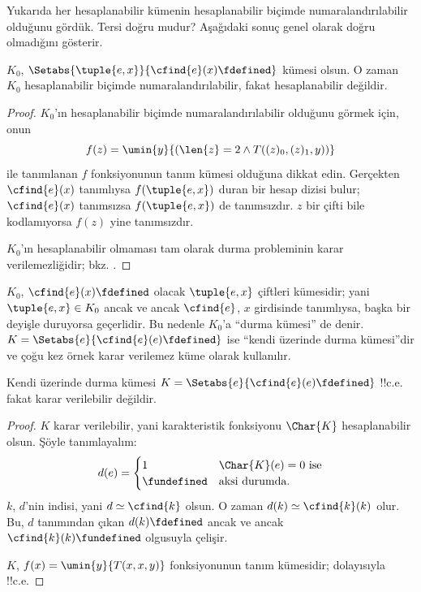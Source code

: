 \documentclass[../../../include/open-logic-section]{subfiles}
\begin{document}

Yukarıda her hesaplanabilir kümenin hesaplanabilir biçimde
numaralandırılabilir olduğunu gördük. Tersi doğru mudur? Aşağıdaki sonuç
genel olarak doğru olmadığını gösterir.

\begin{thm}
$K_0$, $\Setabs{\tuple{e,x}}{\cfind{e}(x)\fdefined}$ kümesi olsun.
O zaman $K_0$ hesaplanabilir biçimde numaralandırılabilir, fakat
hesaplanabilir değildir.
\end{thm}

\begin{proof}
$K_0$'ın hesaplanabilir biçimde numaralandırılabilir olduğunu görmek için,
onun
\[
  f(z)=\umin{y}{(\len{z}=2\land T((z)_0,(z)_1,y))}
\]
ile tanımlanan $f$ fonksiyonunun tanım kümesi olduğuna dikkat edin.
Gerçekten $\cfind{e}(x)$ tanımlıysa $f(\tuple{e,x})$ duran bir hesap dizisi
bulur; $\cfind{e}(x)$ tanımsızsa $f(\tuple{e,x})$ de tanımsızdır. $z$ bir
çifti bile kodlamıyorsa $f(z)$ yine tanımsızdır.

$K_0$'ın hesaplanabilir olmaması tam olarak durma probleminin karar
verilemezliğidir; bkz. .
\end{proof}

$K_0$, $\cfind{e}(x)\fdefined$ olacak $\tuple{e,x}$ çiftleri kümesidir;
yani $\tuple{e,x}\in K_0$ ancak ve ancak $\cfind{e}$, $x$ girdisinde
tanımlıysa, başka bir deyişle duruyorsa geçerlidir. Bu nedenle $K_0$'a
``durma kümesi'' de denir. $K=\Setabs{e}{\cfind{e}(e)\fdefined}$ ise
``kendi üzerinde durma kümesi''dir ve çoğu kez örnek karar verilemez küme
olarak kullanılır.

\begin{thm}
Kendi üzerinde durma kümesi
$K=\Setabs{e}{\cfind{e}(e)\fdefined}$ !!{c.e.} fakat karar verilebilir
değildir.
\end{thm}

\begin{proof}
  $K$ karar verilebilir, yani karakteristik fonksiyonu $\Char{K}$
  hesaplanabilir olsun. Şöyle tanımlayalım:
  \[
    d(e)=\begin{cases}
      1 & \text{$\Char{K}(e)=0$ ise}\\
      \fundefined & \text{aksi durumda.}
    \end{cases}
  \]
  $k$, $d$'nin indisi, yani $d\simeq\cfind{k}$ olsun. O zaman
  $d(k)\simeq\cfind{k}(k)$ olur. Bu, $d$ tanımından çıkan
  $d(k)\fdefined$ ancak ve ancak $\cfind{k}(k)\fundefined$ olgusuyla
  çelişir.

  $K$, $f(x)=\umin{y}{T(x,x,y)}$ fonksiyonunun tanım kümesidir;
  dolayısıyla !!{c.e.}
\end{proof}
\end{document}
